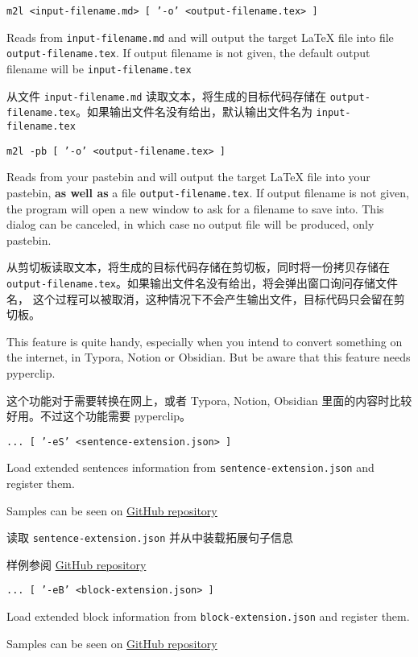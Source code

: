 \documentclass{ctexart}
\begin{document}
	\texttt{m2l <input-filename.md> [ '-o' <output-filename.tex> ]}
	
	Reads from \texttt{input-filename.md} and will output the target LaTeX file into file \texttt{output-filename.tex}. If output filename is not given, the default output filename will be \texttt{input-filename.tex}
	
	从文件 \texttt{input-filename.md} 读取文本，将生成的目标代码存储在 \texttt{output-filename.tex}。如果输出文件名没有给出，默认输出文件名为 \texttt{input-filename.tex}
	
	\texttt{m2l -pb [ '-o' <output-filename.tex> ]}
	
	Reads from your pastebin and will output the target LaTeX file into your pastebin, \textbf{as well as} a file \texttt{output-filename.tex}. If output filename is not given, the program will open a new window to ask for a filename to save into. This dialog can be canceled, in which case no output file will be produced, only pastebin.
	
	从剪切板读取文本，将生成的目标代码存储在剪切板，同时将一份拷贝存储在 \texttt{output-filename.tex}。如果输出文件名没有给出，将会弹出窗口询问存储文件名， 这个过程可以被取消，这种情况下不会产生输出文件，目标代码只会留在剪切板。
	
	This feature is quite handy, especially when you intend to convert something on the internet, in Typora, Notion or Obsidian. But be aware that this feature needs pyperclip.
	
	这个功能对于需要转换在网上，或者 Typora, Notion, Obsidian 里面的内容时比较好用。不过这个功能需要 pyperclip。
	
	\texttt{... [ '-eS' <sentence-extension.json> ]}
	
	Load extended sentences information from \texttt{sentence-extension.json} and register them.
	
	Samples can be seen on \href{https://github.com/TrickEye/md2latex-converter/blob/master/sentence_extension.json}{GitHub repository}
	
	读取 \texttt{sentence-extension.json} 并从中装载拓展句子信息
	
	样例参阅 \href{https://github.com/TrickEye/md2latex-converter/blob/master/sentence_extension.json}{GitHub repository}
	
	\texttt{... [ '-eB' <block-extension.json> ]}
	
	Load extended block information from \texttt{block-extension.json} and register them.
	
	Samples can be seen on \href{https://github.com/TrickEye/md2latex-converter/blob/master/block_extension.json}{GitHub repository}
	
\end{document}
